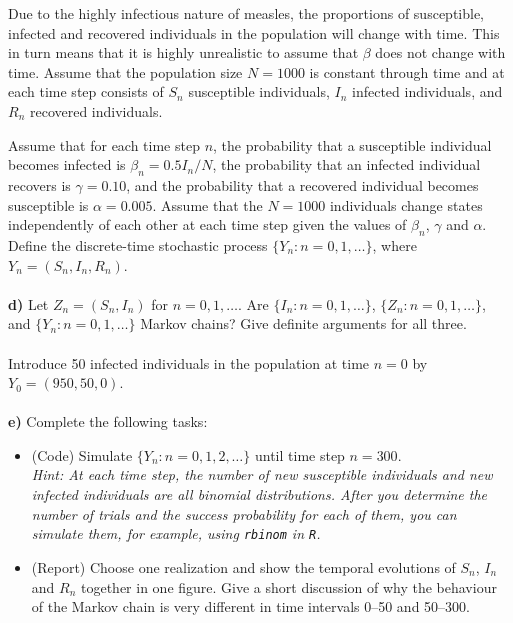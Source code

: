 \documentclass[1p]{article}		%
\begin{document}
\noindent Due to the highly infectious nature of measles, the proportions of susceptible, infected 
and recovered individuals in the population will
change with time.
This in turn means that it is highly unrealistic to assume that $\beta$ does not change 
with time. Assume that the population size $N = 1000$ is constant through time and 
at each time step consists of 
$S_n$ susceptible individuals, $I_n$ infected individuals, and $R_n$ recovered individuals.

Assume that for each time step $n$, the probability that a susceptible individual becomes infected is
$\beta_n = 0.5I_n/N$, the probability that
an infected individual recovers is $\gamma = 0.10$, and the probability that
a recovered individual becomes susceptible is $\alpha = 0.005$. Assume that the $N = 1000$
individuals change states independently of each other at each time step
given the values of $\beta_n$, $\gamma$ and $\alpha$. Define the discrete-time stochastic process $\{Y_n: n = 0, 1, \ldots\}$, where 
$Y_n = (S_n, I_n, R_n)$. 
\\\\
\textbf{d)} Let $Z_n = (S_n, I_n)$ for $n = 0, 1, \ldots$. Are $\{I_n: n = 0, 1, \ldots\}$,
$\{Z_n: n = 0, 1, \ldots\}$, and $\{Y_n: n = 0, 1, \ldots\}$ Markov chains? Give definite arguments for all three.\\\\
Introduce 50 infected individuals in the population at time $n = 0$
by
$Y_0 = (950, 50, 0)$. \\\\
\textbf{e)} Complete the following tasks:
\begin{itemize}
  \item (Code) Simulate $\{Y_n: n = 0, 1, 2,\ldots\}$ until time step
$n = 300$.\\
\textit{Hint: At each time step, the number of new susceptible individuals and new infected individuals are all binomial distributions. After you determine the number of trials and the success probability for each of them, you can simulate them, for example, using
 \texttt{rbinom} in \texttt{R}.}
  \item (Report) Choose one realization and show the temporal evolutions of $S_n$, $I_n$ and $R_n$ together in 
one figure. Give a short discussion of why the behaviour of the Markov chain is very different
in time intervals 0--50 and 50--300.
\end{itemize} 
\vspace{0.1cm}
\end{document}
